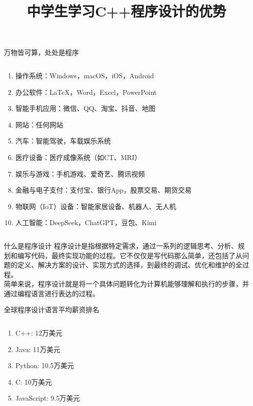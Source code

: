 \documentclass{beamer}
\title{中学生学习C++程序设计的优势}
\begin{document}
\frame{\titlepage}
\begin{frame}[t]{万物皆可算，处处是程序}
\begin{columns}
\begin{spacing}{1.1}
\large
\begin{enumerate}[label={\arabic*.}]
\item 操作系统：Windows，macOS，iOS，Android
\item 办公软件：LaTeX，Word，Excel，PowerPoint
\item 智能手机应用：微信、QQ、淘宝、抖音、地图
\item 网站：任何网站
\item 汽车：智能驾驶，车载娱乐系统
\item 医疗设备：医疗成像系统（如CT、MRI）
\item 娱乐与游戏：手机游戏、爱奇艺、腾讯视频
\item 金融与电子支付：支付宝、银行App，股票交易、期货交易
\item 物联网（IoT）设备：智能家居设备、机器人、无人机
\item 人工智能：DeepSeek，ChatGPT，豆包、Kimi
\end{enumerate}
\end{spacing}
\end{columns}
\end{frame}

\begin{frame}[t]{什么是程序设计}
程序设计是指根据特定需求，通过一系列的\alert{逻辑思考、分析、规划和编写代码}，最终实现功能的过程。它不仅仅是写代码那么简单，还包括了从问题的定义、解决方案的设计、实现方式的选择，到最终的调试、优化和维护的全过程。\\
\vspace*{1cm}
简单来说，程序设计就是\alert{将一个具体问题转化为计算机能够理解和执行的步骤}，并通过编程语言进行表达的过程。
\end{frame}

\begin{frame}{全球程序设计语言平均薪资排名}
\begin{columns}
\begin{spacing}{1.5}
\Large
    \begin{enumerate}[label={\arabic*.}]
        \item C++: 12万美元
        \item Java: 11万美元
        \item Python: 10.5万美元
        \item C: 10万美元
        \item JavaScript: 9.5万美元
    \end{enumerate}
\end{spacing}
\end{columns}
\end{frame}
\end{document}
